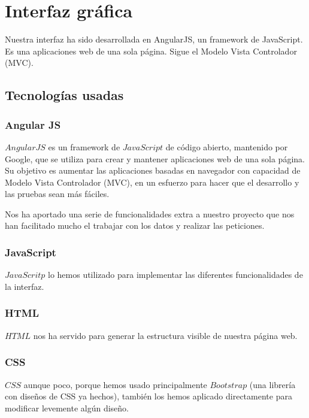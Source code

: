 \documentclass[12pt,a4paper]{article}
\begin{document}
\section{Interfaz gráfica} \label{pto7}

Nuestra interfaz ha sido desarrollada en AngularJS, un framework de JavaScript. Es una aplicaciones web de una sola página. Sigue el Modelo Vista Controlador (MVC).

\subsection{Tecnologías usadas} \label{pto71}
	\subsubsection{Angular JS} \label{pto711}
	
	$AngularJS$ es un framework de $JavaScript$ de código abierto, mantenido por Google, que se utiliza para crear y mantener aplicaciones web de una sola página. Su objetivo es aumentar las aplicaciones basadas en navegador con capacidad de Modelo Vista Controlador (MVC), en un esfuerzo para hacer que el desarrollo y las pruebas sean más fáciles.
	
Nos ha aportado una serie de funcionalidades extra a nuestro proyecto que nos han facilitado mucho el trabajar con los datos y realizar las peticiones.
	\subsubsection{JavaScript} \label{pto712}
	
	$JavaScritp$ lo hemos utilizado para implementar las diferentes funcionalidades de la interfaz.
	
	\subsubsection{HTML} \label{pto713}
	
$HTML$ nos ha servido para generar la estructura visible de nuestra página web.

	\subsubsection{CSS} \label{pto714}
	
	$CSS$ aunque poco, porque hemos usado principalmente $Bootstrap$ (una librería con diseños de CSS ya hechos),  también los hemos aplicado directamente para modificar levemente algún diseño.
	
\end{document}
